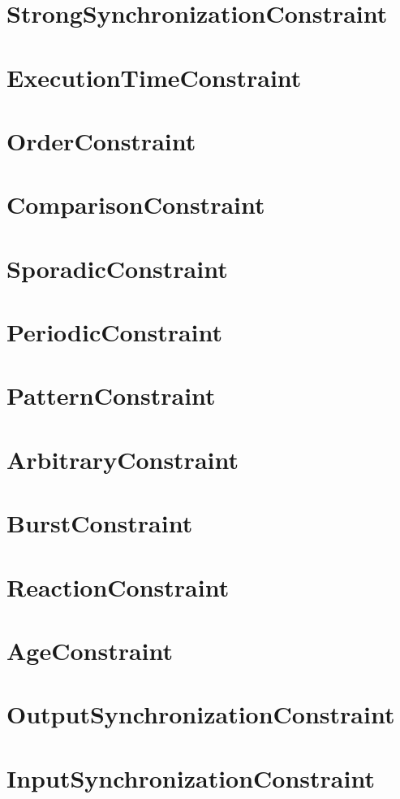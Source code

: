 \section{StrongSynchronizationConstraint}
\section{ExecutionTimeConstraint}
\section{OrderConstraint}
\section{ComparisonConstraint}
\section{SporadicConstraint}
\section{PeriodicConstraint}
\section{PatternConstraint}
\section{ArbitraryConstraint}
\section{BurstConstraint}
\section{ReactionConstraint}
\section{AgeConstraint}
\section{OutputSynchronizationConstraint}
\section{InputSynchronizationConstraint}
	
	

